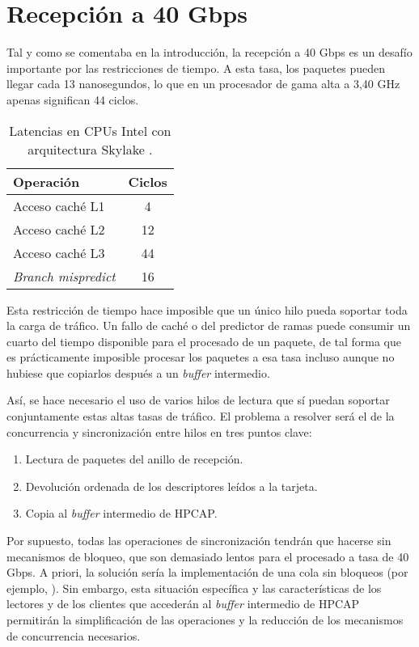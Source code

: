 \documentclass[oneside, draft]{epstfg}
\begin{document}
\section{Recepción a 40 Gbps}

Tal y como se comentaba en la introducción, la recepción a 40 Gbps es un desafío importante por las restricciones de tiempo. A esta tasa, los paquetes pueden llegar cada 13 nanosegundos, lo que en un procesador de gama alta a 3,40 GHz apenas significan 44 ciclos.

\begin{wraptable}[8]{l}[1.5cm]{0.35\textwidth}
\vspace{-15pt}
\begin{tabular}{l|c}
\textbf{Operación} & \textbf{Ciclos} \\ \toprule
Acceso caché L1 & 4 \\
Acceso caché L2 & 12 \\
Acceso caché L3 & 44 \\
\textit{Branch mispredict} & 16 \\ \bottomrule
\end{tabular}
\caption{Latencias en CPUs Intel con arquitectura Skylake \cite{intelOptimization}.}
\label{tab:LatenciaIntelSkylake}
\end{wraptable}

Esta restricción de tiempo hace imposible que un único hilo pueda soportar toda la carga de tráfico. Un fallo de caché o del predictor de ramas  puede consumir un cuarto del tiempo disponible para el procesado de un paquete, de tal forma que es prácticamente imposible procesar los paquetes a esa tasa incluso aunque no hubiese que copiarlos después a un \textit{buffer} intermedio.

Así, se hace necesario el uso de varios hilos de lectura que sí puedan soportar conjuntamente estas altas tasas de tráfico. El problema a resolver será el de la concurrencia y sincronización entre hilos en tres puntos clave:

\begin{enumerate}[itemsep=0pt, topsep = 0pt]
\item Lectura de paquetes del anillo de recepción.
\item Devolución ordenada de los descriptores leídos a la tarjeta.
\item Copia al \textit{buffer} intermedio de HPCAP.
\end{enumerate}

Por supuesto, todas las operaciones de sincronización tendrán que hacerse sin mecanismos de bloqueo, que son demasiado lentos para el procesado a tasa de 40 Gbps. A priori, la solución sería la implementación de una cola sin bloqueos (por ejemplo, \cite{krizhanovsky2013lock}). Sin embargo, esta situación específica y las características de los lectores y de los clientes que accederán al \textit{buffer} intermedio de HPCAP permitirán la simplificación de las operaciones y la reducción de los mecanismos de concurrencia necesarios.
\end{document}
